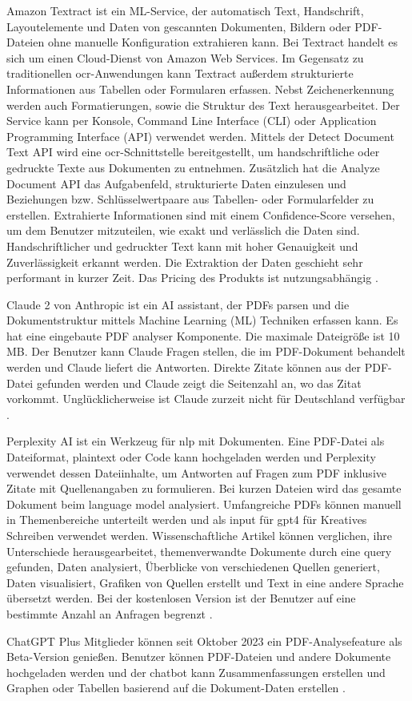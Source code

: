 Amazon Textract ist ein ML-Service, der automatisch Text, Handschrift, Layoutelemente und Daten von gescannten Dokumenten, Bildern oder PDF-Dateien ohne manuelle Konfiguration extrahieren kann. Bei Textract handelt es sich um einen Cloud-Dienst von Amazon Web Services. Im Gegensatz zu traditionellen \gls{ocr}-Anwendungen kann Textract außerdem strukturierte Informationen aus Tabellen oder Formularen erfassen. Nebst Zeichenerkennung werden auch Formatierungen, sowie die Struktur des Text herausgearbeitet. Der Service kann per Konsole, Command Line Interface (CLI) oder Application Programming Interface (API) verwendet werden. Mittels der Detect Document Text API wird eine \gls{ocr}-Schnittstelle bereitgestellt, um handschriftliche oder gedruckte Texte aus Dokumenten zu entnehmen. Zusätzlich hat die Analyze Document API das Aufgabenfeld, strukturierte Daten einzulesen und Beziehungen bzw. Schlüsselwertpaare aus Tabellen- oder Formularfelder zu erstellen. Extrahierte Informationen sind mit einem Confidence-Score versehen, um dem Benutzer mitzuteilen, wie exakt und verlässlich die Daten sind. Handschriftlicher und gedruckter Text kann mit hoher Genauigkeit und Zuverlässigkeit erkannt werden. Die Extraktion der Daten geschieht sehr performant in kurzer Zeit. Das Pricing des Produkts ist nutzungsabhängig \cite{textract}.


Claude 2 von Anthropic ist ein AI assistant, der PDFs parsen und die Dokumentstruktur mittels Machine Learning (ML) Techniken erfassen kann. Es hat eine eingebaute PDF analyser Komponente. Die maximale Dateigröße ist 10 MB. Der Benutzer kann Claude Fragen stellen, die im PDF-Dokument behandelt werden und Claude liefert die Antworten. Direkte Zitate können aus der PDF-Datei gefunden werden und Claude zeigt die Seitenzahl an, wo das Zitat vorkommt. Unglücklicherweise ist Claude zurzeit nicht für Deutschland verfügbar \cite{hackernoon-claude}.

Perplexity AI ist ein Werkzeug für \gls{nlp} mit Dokumenten. Eine PDF-Datei als Dateiformat, plaintext oder Code kann hochgeladen werden und Perplexity verwendet dessen Dateiinhalte, um Antworten auf Fragen zum PDF inklusive Zitate mit Quellenangaben zu formulieren. Bei kurzen Dateien wird das gesamte Dokument beim language model analysiert. Umfangreiche PDFs können manuell in Themenbereiche unterteilt werden und als input für \gls{gpt4} für Kreatives Schreiben verwendet werden. Wissenschaftliche Artikel können verglichen, ihre Unterschiede herausgearbeitet, themenverwandte Dokumente durch eine query gefunden, Daten analysiert, Überblicke von verschiedenen Quellen generiert, Daten visualisiert, Grafiken von Quellen erstellt und Text in eine andere Sprache übersetzt werden. Bei der kostenlosen Version ist der Benutzer auf eine bestimmte Anzahl an Anfragen begrenzt \cite{hackernoon-claude}.

ChatGPT Plus Mitglieder können seit Oktober 2023 ein PDF-Analysefeature als Beta-Version genießen. Benutzer können PDF-Dateien und andere Dokumente hochgeladen werden und der chatbot kann Zusammenfassungen erstellen und Graphen oder Tabellen basierend auf die Dokument-Daten erstellen \cite{hackernoon-claude}.

